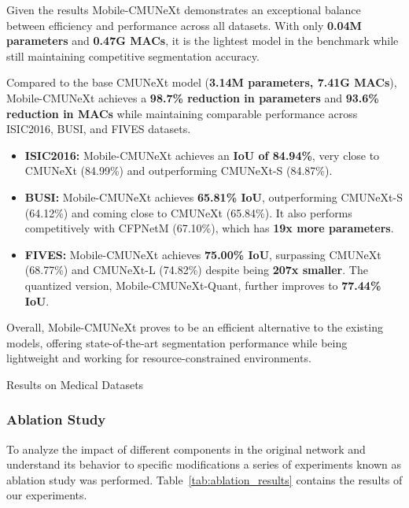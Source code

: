 \documentclass[lettersize,journal]{IEEEtran}
\begin{document}
Given the results Mobile-CMUNeXt demonstrates an exceptional balance between efficiency and performance across all datasets. With only \textbf{0.04M parameters} and \textbf{0.47G MACs}, it is the lightest model in the benchmark while still maintaining competitive segmentation accuracy.  

Compared to the base CMUNeXt model (\textbf{3.14M parameters, 7.41G MACs}), Mobile-CMUNeXt achieves a \textbf{98.7\% reduction in parameters} and \textbf{93.6\% reduction in MACs} while maintaining comparable performance across ISIC2016, BUSI, and FIVES datasets.  

\begin{itemize}
    \item \textbf{ISIC2016:} Mobile-CMUNeXt achieves an \textbf{IoU of 84.94\%}, very close to CMUNeXt (84.99\%) and outperforming CMUNeXt-S (84.87\%). 

    \item \textbf{BUSI:} Mobile-CMUNeXt achieves \textbf{65.81\% IoU}, outperforming CMUNeXt-S (64.12\%) and coming close to CMUNeXt (65.84\%). It also performs competitively with CFPNetM (67.10\%), which has \textbf{19x more parameters}.  

    \item \textbf{FIVES:} Mobile-CMUNeXt achieves \textbf{75.00\% IoU}, surpassing CMUNeXt (68.77\%) and CMUNeXt-L (74.82\%) despite being \textbf{207x smaller}. The quantized version, Mobile-CMUNeXt-Quant, further improves to \textbf{77.44\% IoU}.  
\end{itemize}

Overall, Mobile-CMUNeXt proves to be an efficient alternative to the existing models, offering state-of-the-art segmentation performance while being lightweight and working for resource-constrained environments.  


\begin{table}[htb]
    \fittowidth{}
\caption{Results on Medical Datasets}
\label{tab:results}
\end{table}


\subsubsection{Ablation Study}  
To analyze the impact of different components in the original network and understand its behavior to specific modifications a series of experiments known as ablation study was performed. Table~\ref{tab:ablation_results} contains the results of our experiments.
\end{document}
